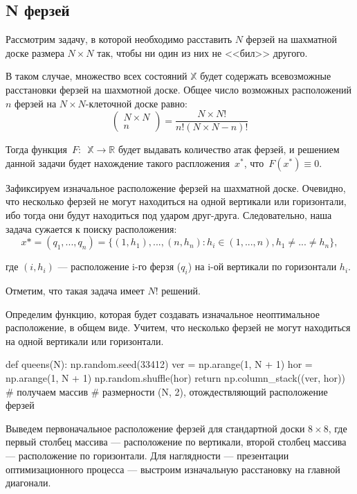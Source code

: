 	
	\subsection{N ферзей}
	\noindent Рассмотрим задачу, в которой необходимо расставить $N$ ферзей на шахматной доске размера $N \times  N$ так, чтобы ни один из них не <<бил>> другого.
	
	В таком случае, множество всех состояний $\mathbb{X}$ будет содержать всевозможные расстановки ферзей на шахмотной доске. Общее число возможных расположений $n$ ферзей на $N \times N$-клеточной доске равно:
	\[
	{\begin{pmatrix} N \times N  \\ n \end{pmatrix}} = \dfrac{N \times N!}{n! (N \times N - n)!}
	\]
	
	Тогда  функция~$F:$~$\mathbb{X} \to \mathbb{R}$ будет выдавать количество атак ферзей, и решением данной задачи будет нахождение такого распложения~$x^{*}$, что~$F(x^*) \equiv 0$.
	
	Зафиксируем изначальное расположение ферзей на шахматной доске. Очевидно, что несколько ферзей не могут находиться на одной вертикали или горизонтали, ибо тогда они будут находиться под ударом друг-друга. Следовательно, наша задача сужается к поиску расположения:
	\begin{equation}
	x* = (q_1, ..., q_n) = \{(1, h_1), ..., (n, h_n): h_i \in (1, ..., n), h_1 \neq ...  \neq h_n\},
	\end{equation}
	
	где $(i, h_i)$ — расположение i-го ферзя ($q_i$) на i-ой вертикали по горизонтали $h_i$.
	
	Отметим, что такая задача имеет $N!$ решений.
	
	Определим функцию, которая будет создавать изначальное неоптимальное расположение, в общем виде. Учитем, что несколько ферзей не могут находиться на одной вертикали или горизонтали.

\begin{pyin}
def queens(N):
 np.random.seed(33412)
 ver = np.arange(1, N + 1)
 hor = np.arange(1, N + 1)
 np.random.shuffle(hor)
 return np.column_stack((ver, hor)) # получаем массив
 # размерности (N, 2), отождествляющий расположение ферзей
\end{pyin}
	
	Выведем первоначальное расположение ферзей для стандартной доски $8 \times 8$, где первый столбец массива — расположение по вертикали, второй столбец массива — расположение по горизонтали. Для наглядности — презентации оптимизационного процесса — выстроим изначальную расстановку на главной диагонали.
	
